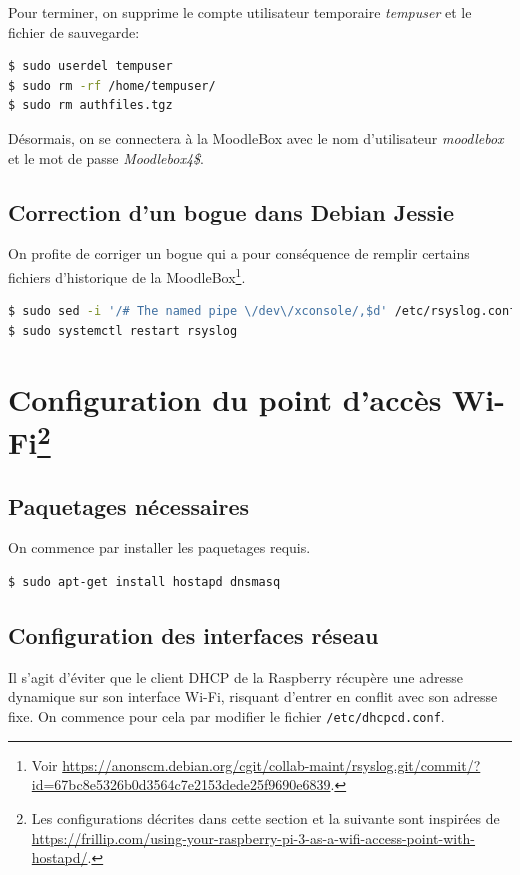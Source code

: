 \documentclass[11pt]{article}
\begin{document}
Pour terminer, on supprime le compte utilisateur temporaire \emph{tempuser} et le fichier de sauvegarde:
\begin{lstlisting}[language=bash]
$ sudo userdel tempuser
$ sudo rm -rf /home/tempuser/
$ sudo rm authfiles.tgz
\end{lstlisting}

Désormais, on se connectera à la MoodleBox avec le nom d'utilisateur \emph{moodlebox} et le mot de passe \emph{Moodlebox4\$}.

\subsection{Correction d'un bogue dans Debian Jessie}

On profite de corriger un bogue qui a pour conséquence de remplir certains fichiers d'historique de la MoodleBox\footnote{Voir \url{https://anonscm.debian.org/cgit/collab-maint/rsyslog.git/commit/?id=67bc8e5326b0d3564c7e2153dede25f9690e6839}.}.

\begin{lstlisting}[language=bash]
$ sudo sed -i '/# The named pipe \/dev\/xconsole/,$d' /etc/rsyslog.conf
$ sudo systemctl restart rsyslog
\end{lstlisting}

\section[Configuration du point d'accès Wi-Fi]{Configuration du point d'accès Wi-Fi\footnote{Les configurations décrites dans cette section et la suivante sont inspirées de \url{https://frillip.com/using-your-raspberry-pi-3-as-a-wifi-access-point-with-hostapd/}.}}

\subsection{Paquetages nécessaires}

On commence par installer les paquetages requis.
\begin{lstlisting}[language=bash]
$ sudo apt-get install hostapd dnsmasq
\end{lstlisting}

\subsection{Configuration des interfaces réseau}

Il s'agit d'éviter que le client DHCP de la Raspberry récupère une adresse dynamique sur son interface Wi-Fi, risquant d'entrer en conflit avec son adresse fixe. On commence pour cela par modifier le fichier \lstinline{/etc/dhcpcd.conf}.
\end{document}
